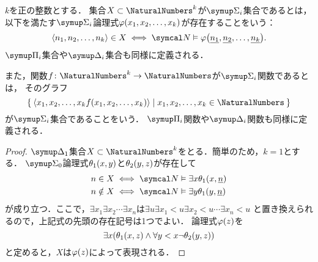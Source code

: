 \begin{Def} \label{Def:sigmaset}
	\(k\)を正の整数とする．
	集合\(X \subset \NaturalNumbers^k\)が\(\SigmaFormula_i\)集合であるとは，
	以下を満たす\(\SigmaFormula_i\)論理式\(\apply{\varphi}{x_1, x_2, \dots, x_k}\)が存在することをいう：
	\begin{equation}
		\pair{n_1, n_2, \dots, n_k} \in X \metaequivalent \standardmodel \satisfy \apply{\varphi}{\numeral{n_1}, \numeral{n_2}, \dots, \numeral{n_k}}.
		\label{eq:sigmaset}
	\end{equation}
	\(\PiFormula_i\)集合や\(\DeltaFormula_i\)集合も同様に定義される．

	また，関数\(f \colon \NaturalNumbers^k \to \NaturalNumbers\)が\(\SigmaFormula_i\)関数であるとは，
	そのグラフ
	\[
		\Set{\pair{x_1, x_2, \dots, x_k \apply{f}{x_1, x_2, \dots, x_k}} | x_1, x_2, \dots, x_k \in \NaturalNumbers}
	\]
	が\(\SigmaFormula_i\)集合であることをいう．
	\(\PiFormula_i\)関数や\(\DeltaFormula_i\)関数も同様に定義される．
\end{Def}


\begin{proof}
	\(\DeltaFormula_1\)集合\(X \subset \NaturalNumbers^k\)をとる．簡単のため，\(k = 1\)とする．
	\(\SigmaFormula_0\)論理式\(\apply{\theta_1}{x, y}\)と\(\apply{\theta_2}{y, z}\)が存在して
	\begin{align*}
		n \in X    & \metaequivalent \standardmodel \satisfy \exists x \apply{\theta_1}{x, \numeral{n}} \\
		n \notin X & \metaequivalent \standardmodel \satisfy \exists y \apply{\theta_1}{y, \numeral{n}}
	\end{align*}
	が成り立つ．ここで，\(\exists x_1 \exists x_2 \dotsb \exists x_n\)は\(\exists u \exists x_1 < u \exists x_2 < u \dotsb \exists x_n <u\)
	と置き換えられるので，上記式の先頭の存在記号は1つでよい．
	論理式\(\apply{\varphi}{z}\)を
	\[
		\exists x \paren{\apply{\theta_1}{x, z} \land \forall y < x \lnot \apply{\theta_2}{y, z}}
	\]
	と定めると，\(X\)は\(\apply{\varphi}{z}\)によって表現される．
\end{proof}


